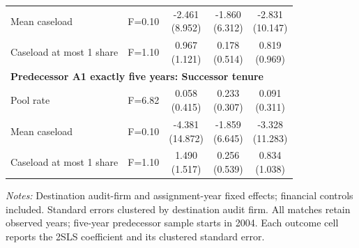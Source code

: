 \begin{table}[htbp]
\begin{threeparttable}
\begin{tabular}{p{}cccc}
Mean caseload & F=0.10 & \shortstack{-2.461\\(8.952)} & \shortstack{-1.860\\(6.312)} & \shortstack{-2.831\\(10.147)} \\
Caseload at most 1 share & F=1.10 & \shortstack{0.967\\(1.121)} & \shortstack{0.178\\(0.514)} & \shortstack{0.819\\(0.969)} \\
\multicolumn{5}{l}{\textbf{Predecessor A1 exactly five years: Successor tenure}} \\
Pool rate & F=6.82 & \shortstack{0.058\\(0.415)} & \shortstack{0.233\\(0.307)} & \shortstack{0.091\\(0.311)} \\
Mean caseload & F=0.10 & \shortstack{-4.381\\(14.872)} & \shortstack{-1.859\\(6.645)} & \shortstack{-3.328\\(11.283)} \\
Caseload at most 1 share & F=1.10 & \shortstack{1.490\\(1.517)} & \shortstack{0.256\\(0.539)} & \shortstack{0.834\\(1.038)} \\
\bottomrule
\end{tabular}
\begin{tablenotes}\footnotesize
\item \raggedright \textit{Notes:} Destination audit-firm and assignment-year fixed effects; financial controls included. Standard errors clustered by destination audit firm. All matches retain observed years; five-year predecessor sample starts in 2004. Each outcome cell reports the 2SLS coefficient and its clustered standard error.
\end{tablenotes}
\end{threeparttable}
\end{table}
